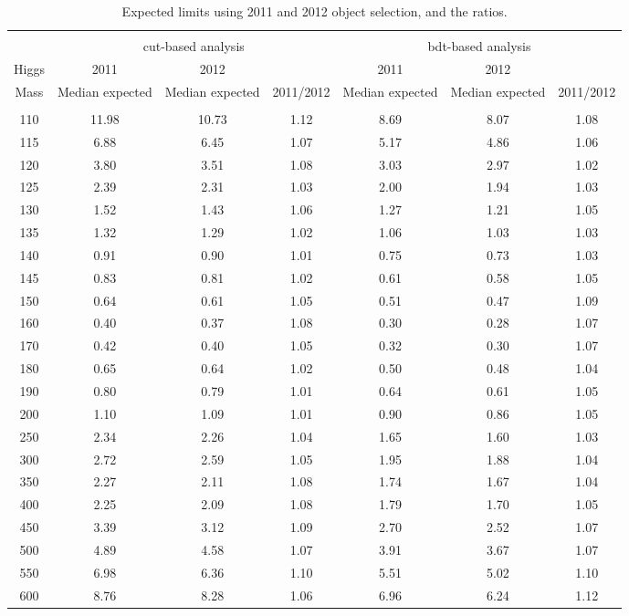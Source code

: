 \begin{table}[hbp!]
\begin{center}
{\normalsize
\begin{tabular}{c c c c c c c}
\hline
\vspace{-3mm} && \\
              & \multicolumn{3}{|c|}{cut-based analysis} & \multicolumn{3}{|c|}{bdt-based analysis} \\
\hline
 Higgs  & 2011            & 2012            &           & 2011  	  & 2012	    &	        \\
 Mass   & Median expected & Median expected & 2011/2012 & Median expected & Median expected & 2011/2012 \\
\vspace{-3mm} && \\
\hline
110 & 11.98 & 10.73 &  1.12  &  8.69 &  8.07 &  1.08 \\ 
115 &  6.88 &  6.45 &  1.07  &  5.17 &  4.86 &  1.06 \\ 
120 &  3.80 &  3.51 &  1.08  &  3.03 &  2.97 &  1.02 \\ 
125 &  2.39 &  2.31 &  1.03  &  2.00 &  1.94 &  1.03 \\ 
130 &  1.52 &  1.43 &  1.06  &  1.27 &  1.21 &  1.05 \\ 
135 &  1.32 &  1.29 &  1.02  &  1.06 &  1.03 &  1.03 \\ 
140 &  0.91 &  0.90 &  1.01  &  0.75 &  0.73 &  1.03 \\ 
145 &  0.83 &  0.81 &  1.02  &  0.61 &  0.58 &  1.05 \\ 
150 &  0.64 &  0.61 &  1.05  &  0.51 &  0.47 &  1.09 \\ 
160 &  0.40 &  0.37 &  1.08  &  0.30 &  0.28 &  1.07 \\ 
170 &  0.42 &  0.40 &  1.05  &  0.32 &  0.30 &  1.07 \\ 
180 &  0.65 &  0.64 &  1.02  &  0.50 &  0.48 &  1.04 \\ 
190 &  0.80 &  0.79 &  1.01  &  0.64 &  0.61 &  1.05 \\ 
200 &  1.10 &  1.09 &  1.01  &  0.90 &  0.86 &  1.05 \\ 
250 &  2.34 &  2.26 &  1.04  &  1.65 &  1.60 &  1.03 \\ 
300 &  2.72 &  2.59 &  1.05  &  1.95 &  1.88 &  1.04 \\ 
350 &  2.27 &  2.11 &  1.08  &  1.74 &  1.67 &  1.04 \\ 
400 &  2.25 &  2.09 &  1.08  &  1.79 &  1.70 &  1.05 \\ 
450 &  3.39 &  3.12 &  1.09  &  2.70 &  2.52 &  1.07 \\ 
500 &  4.89 &  4.58 &  1.07  &  3.91 &  3.67 &  1.07 \\ 
550 &  6.98 &  6.36 &  1.10  &  5.51 &  5.02 &  1.10 \\ 
600 &  8.76 &  8.28 &  1.06  &  6.96 &  6.24 &  1.12 \\\hline
\end{tabular}
\caption{Expected limits using 2011 and 2012 object selection, and the ratios.}
\label{tab:2011AnaResults}
}
\end{center}
\end{table}
